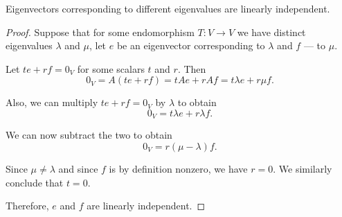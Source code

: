 \begin{lemma}\label{thm:eigenvectors_are_linearly_independent}
  Eigenvectors corresponding to different eigenvalues are linearly independent.
\end{lemma}
\begin{proof}
  Suppose that for some endomorphism \( T: V \to V \) we have distinct eigenvalues \( \lambda \) and \( \mu \), let \( e \) be an eigenvector corresponding to \( \lambda \) and \( f \) --- to \( \mu \).

  Let \( t e + r f = 0_V \) for some scalars \( t \) and \( r \). Then
  \begin{equation*}
    0_V = A(t e + r f) = t A e + r A f = t \lambda e + r \mu f.
  \end{equation*}

  Also, we can multiply \( t e + r f = 0_V \) by \( \lambda \) to obtain
  \begin{equation*}
    0_V = t \lambda e + r \lambda f.
  \end{equation*}

  We can now subtract the two to obtain
  \begin{equation*}
    0_V = r (\mu - \lambda) f.
  \end{equation*}

  Since \( \mu \neq \lambda \) and since \( f \) is by definition nonzero, we have \( r = 0 \). We similarly conclude that \( t = 0 \).

  Therefore, \( e \) and \( f \) are linearly independent.
\end{proof}

